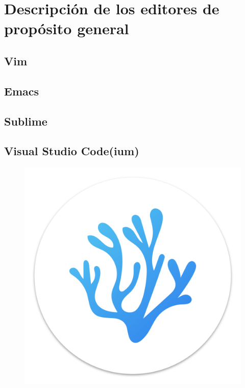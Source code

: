 \chapter{Descripción de los editores de propósito general}

\section{Vim}

\lipsum[1]
\begin{figure}
	
\end{figure}
\lipsum[1]

\section{Emacs}

\lipsum[1]
\begin{figure}
	
\end{figure}
\lipsum[1]

\section{Sublime}

\lipsum[1]
\begin{figure}
	
\end{figure}
\lipsum[1]

\section{Visual Studio Code(ium)}

\lipsum[1]
\begin{figure}
\includegraphics[width=0.19\paperwidth]{./img/editors/vscodium}
\end{figure}
\lipsum[1]

